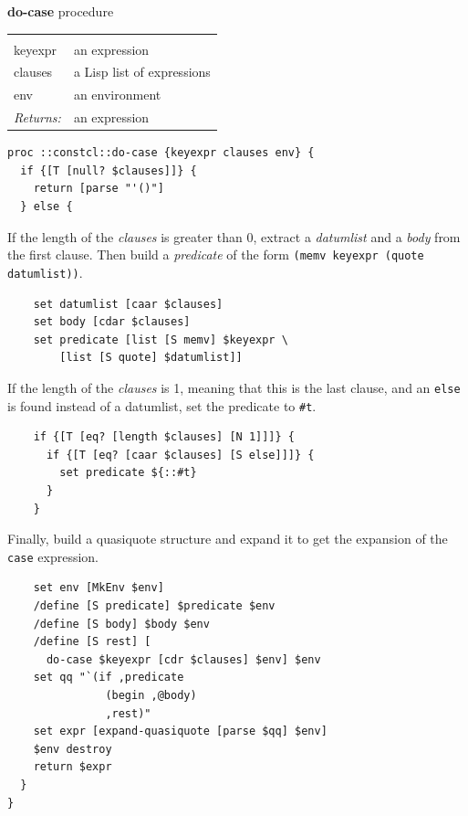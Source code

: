 \documentclass[a5paper,draft]{memoir}
\begin{document}
\textbf{do-case} procedure

\noindent\begin{tabular}{ |p{1.9cm} p{6.5cm}| }
\hline
\rowcolor[HTML]{CCCCCC} \multicolumn{2}{|l|}{\textbf{do-case (internal)}} \\
keyexpr & an expression \\
clauses & a Lisp list of expressions \\
env & an environment \\
\textit{Returns:} & an expression \\
\hline
\end{tabular}

\begin{lstlisting}
proc ::constcl::do-case {keyexpr clauses env} {
  if {[T [null? $clauses]]} {
    return [parse "'()"]
  } else {
\end{lstlisting}

If the length of the \emph{clauses} is greater than 0, extract a \emph{datumlist} and a \emph{body} from the first clause. Then build a \emph{predicate} of the form \texttt{(memv keyexpr (quote datumlist))}.

\begin{lstlisting}
    set datumlist [caar $clauses]
    set body [cdar $clauses]
    set predicate [list [S memv] $keyexpr \
        [list [S quote] $datumlist]]
\end{lstlisting}

If the length of the \emph{clauses} is 1, meaning that this is the last clause, and an \texttt{else} is found instead of a datumlist, set the predicate to \texttt{\#t}.

\begin{lstlisting}
    if {[T [eq? [length $clauses] [N 1]]]} {
      if {[T [eq? [caar $clauses] [S else]]]} {
        set predicate ${::#t}
      }
    }
\end{lstlisting}

Finally, build a quasiquote structure and expand it to get the expansion of the \texttt{case} expression.

\begin{lstlisting}
    set env [MkEnv $env]
    /define [S predicate] $predicate $env
    /define [S body] $body $env
    /define [S rest] [
      do-case $keyexpr [cdr $clauses] $env] $env
    set qq "`(if ,predicate
               (begin ,@body)
               ,rest)"
    set expr [expand-quasiquote [parse $qq] $env]
    $env destroy
    return $expr
  }
}
\end{lstlisting}
\end{document}

